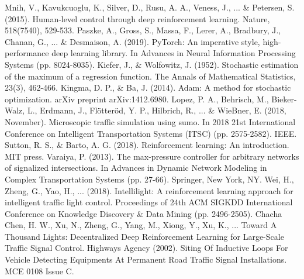 \documentclass{article}
\begin{document}
\begin{thebibliography}{00}
 Mnih, V., Kavukcuoglu, K., Silver, D., Rusu, A. A., Veness, J.,  ... \& Petersen, S. (2015). Human-level control through deep reinforcement learning. Nature, 518(7540), 529-533.
 Paszke, A., Gross, S., Massa, F., Lerer, A., Bradbury, J., Chanan, G., ... \& Desmaison, A. (2019). PyTorch: An imperative style, high-performance deep learning library. In Advances in Neural Information Processing Systems (pp. 8024-8035).
 Kiefer, J., \& Wolfowitz, J. (1952). Stochastic estimation of the maximum of a regression function. The Annals of Mathematical Statistics, 23(3), 462-466.
 Kingma, D. P., \& Ba, J. (2014). Adam: A method for stochastic optimization. arXiv preprint arXiv:1412.6980.
 Lopez, P. A., Behrisch, M., Bieker-Walz, L., Erdmann, J., Flötteröd, Y. P., Hilbrich, R., ... \& WieBner, E. (2018, November). Microscopic traffic simulation using sumo. In 2018 21st International Conference on Intelligent Transportation Systems (ITSC) (pp. 2575-2582). IEEE.
 Sutton, R. S., \& Barto, A. G. (2018). Reinforcement learning: An introduction. MIT press.
 Varaiya, P. (2013). The max-pressure controller for arbitrary networks of signalized intersections. In Advances in Dynamic Network Modeling in Complex Transportation Systems (pp. 27-66). Springer, New York, NY.
 Wei, H., Zheng, G., Yao, H., ... (2018). Intellilight: A reinforcement learning approach for intelligent traffic light control. Proceedings of  24th ACM SIGKDD International Conference on Knowledge Discovery \& Data Mining (pp. 2496-2505).
 Chacha Chen, H. W., Xu, N., Zheng, G., Yang, M., Xiong, Y., Xu, K., ... Toward A Thousand Lights: Decentralized Deep Reinforcement Learning for Large-Scale Traffic Signal Control.
 Highways Agency (2002). Siting Of Inductive Loops For Vehicle Detecting Equipments At Permanent Road Traffic Signal Installations. MCE 0108 Issue C.
\end{thebibliography}
\end{document}
